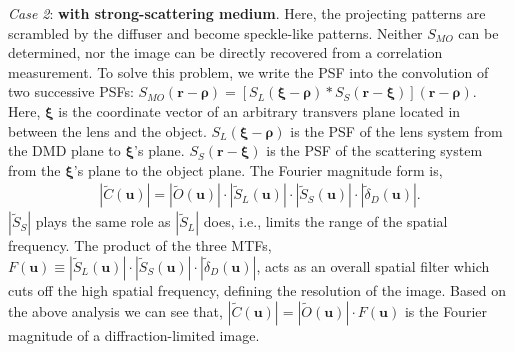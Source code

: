 \documentclass[amsmath,amssymb,aps,prl,groupedaddress,floatfix,12pt]{revtex4-1}
\begin{document}
{\it Case 2}: {\bf with strong-scattering medium}. Here, the projecting patterns are scrambled by the diffuser and become speckle-like patterns. Neither ${S}_{MO}$ can be determined, nor the image can be directly recovered from a correlation measurement. To solve this problem, we write the PSF into the convolution of two successive PSFs: $S_{MO}({\boldsymbol r}-{\boldsymbol \rho})=[S_{L}({\boldsymbol \xi}-{\boldsymbol \rho}){\ast} S_{S}({\boldsymbol r}-{\boldsymbol \xi})]({\boldsymbol r}-{\boldsymbol \rho})$. Here, ${\boldsymbol \xi}$ is the coordinate vector of an arbitrary transvers plane located in between the lens and the object. $S_L({\boldsymbol \xi}-{\boldsymbol \rho})$ is the PSF of the lens system from the DMD plane to ${\boldsymbol \xi}$'s plane. $ S_{S}({\boldsymbol r}-{\boldsymbol \xi})$ is the PSF of the scattering system from the ${\boldsymbol \xi}$'s plane to the object plane.  The Fourier magnitude form is, 
\begin{align}\label{eq:FTCMSCT}    
    |\tilde{C}({\boldsymbol u})|=|\tilde{O}({\boldsymbol u})|\cdot |\tilde{S}_{L}({\boldsymbol u})|\cdot |\tilde{S}_{S}({\boldsymbol u})| \cdot |\tilde{\delta}_{D}({\boldsymbol u})|.
\end{align} 
$|\tilde{S}_S|$  plays the same role as $|\tilde{S}_L|$ does, i.e., limits the range of the spatial frequency. The product of the three MTFs, $F({\boldsymbol u})\equiv |\tilde{S}_{L}({\boldsymbol u})|\cdot |\tilde{S}_{S}({\boldsymbol u})|\cdot|\tilde{\delta}_{D}({\boldsymbol u})|$, acts as an overall spatial filter which cuts off the high spatial frequency, defining the resolution of the image. Based on the above analysis we can see that, $|\tilde{C}({\boldsymbol u})|=|\tilde{O}({\boldsymbol u})|\cdot F({\boldsymbol u})$ is the Fourier magnitude of a diffraction-limited image.
\end{document}
